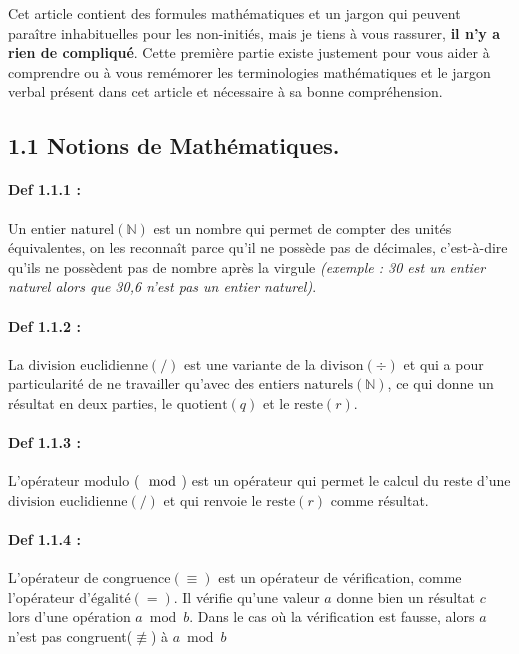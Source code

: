 \documentclass[
  paper=a4,
  ,captions=tableheading
]{scrartcl}
\begin{document}
Cet article contient des formules mathématiques et un jargon qui peuvent
paraître inhabituelles pour les non-initiés, mais je tiens à vous
rassurer, \textbf{il n'y a rien de compliqué}. Cette première partie
existe justement pour vous aider à comprendre ou à vous remémorer les
terminologies mathématiques et le jargon verbal présent dans cet article
et nécessaire à sa bonne compréhension.

\subsection{1.1 Notions de
Mathématiques.}\label{notions-de-mathuxe9matiques.}

\paragraph{Def 1.1.1 :}\label{def-1.1.1}

Un \(\text{entier naturel}(\mathbb{N})\) est un nombre qui permet de
compter des unités équivalentes, on les reconnaît parce qu'il ne possède
pas de décimales, c'est-à-dire qu'ils ne possèdent pas de nombre après
la virgule \emph{(exemple : 30 est un entier naturel alors que 30,6
n'est pas un entier naturel)}.

\paragraph{Def 1.1.2 :}\label{def-1.1.2}

La \(\text{division euclidienne}(/)\) est une variante de la
\(\text{divison}(\div)\) et qui a pour particularité de ne travailler
qu'avec des \(\text{entiers naturels}(\mathbb{N})\), ce qui donne un
résultat en deux parties, le \(\text{quotient}(q)\) et le
\(\text{reste}(r)\).

\paragraph{Def 1.1.3 :}\label{def-1.1.3}

L'opérateur \(\text{modulo}\) (\(\mod\)) est un opérateur qui permet le
calcul du reste d'une \(\text{division euclidienne}(/)\) et qui renvoie
le \(\text{reste}(r)\) comme résultat.

\paragraph{Def 1.1.4 :}\label{def-1.1.4}

L'opérateur de \(\text{congruence}(\equiv)\) est un opérateur de
vérification, comme l'opérateur d'\(\text{égalité}(=)\). Il vérifie
qu'une valeur \(a\) donne bien un résultat \(c\) lors d'une opération
\(a \bmod b\). Dans le cas où la vérification est fausse, alors \(a\)
n'est pas congruent(\(\not\equiv\)) à \(a \bmod b\)
\end{document}
